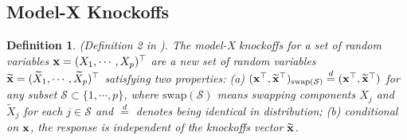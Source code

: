 \documentclass[11pt]{article}
\newtheorem{definition}{Definition}
\def\bx{{\bf x}}
\begin{document}
\subsection{Model-X Knockoffs}

\begin{definition}\label{def1}
	\emph{(Definition 2 in \cite{candes2018panning})}. The model-X knockoffs for a set of random variables $\bx =(X_1,\cdots,X_p)^{\top}$ are a new set of random variables $\widetilde{\bx}=(\widetilde{X}_1, \cdots, \widetilde{X}_p)^{\top}$ satisfying
	two properties: 
	(a) $(\bx^{\top}, \widetilde{\bx}^{\top})_{\mathrm{swap}(\mathcal{S})}\overset{d}{=}(\bx^{\top}, \widetilde{\bx}^{\top})$ for any subset $\mathcal{S}\subset \{1,\cdots,p\}$,
	where $\mathrm{swap}(\mathcal{S})$ means
	swapping components $X_j$ and $\widetilde{X}_j$ for each $j \in \mathcal{S}$ and $\overset{d}{=}$ denotes 
	being identical in distribution; 
	(b) conditional on $\bx$, the response is independent of the knockoffs vector $\widetilde{\bx}$.
\end{definition}
\end{document}
